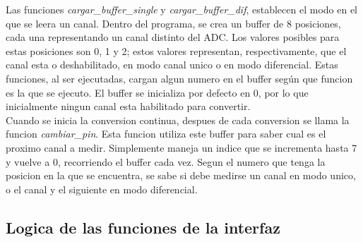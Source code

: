 Las funciones \textit{cargar\_buffer\_single} y \textit{cargar\_buffer\_dif}, establecen el modo en el que se leera un canal. Dentro del programa, se crea un buffer de 8 posiciones, cada una representando un canal distinto del ADC. Los valores posibles para estas posiciones son 0, 1 y 2; estos valores representan, respectivamente, que el canal esta o deshabilitado, en modo canal unico o en modo diferencial. Estas funciones, al ser ejecutadas, cargan algun numero en el buffer según que funcion es la que se ejecuto. El buffer se inicializa por defecto en 0, por lo que inicialmente ningun canal esta habilitado para convertir. \\

Cuando se inicia la conversion continua, despues de cada conversion se llama la funcion \textit{cambiar\_pin}. Esta funcion utiliza este buffer para saber cual es el proximo canal a medir. Simplemente maneja un indice que se incrementa hasta 7 y vuelve a 0, recorriendo el buffer cada vez. Segun el numero que tenga la posicion en la que se encuentra, se sabe si debe medirse un canal en modo unico, o el canal y el siguiente en modo diferencial. \\




\subsection{Logica de las funciones de la interfaz} %
\label{it2:sub:logica_de_las_funciones_de_la_interfaz}

